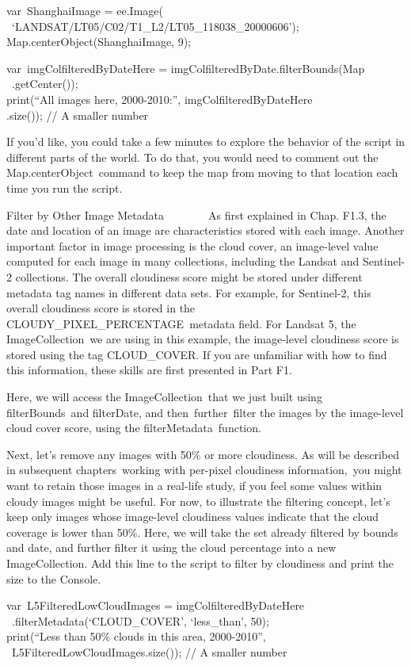 \documentclass[
  letterpaper,
  DIV=11,
  numbers=noendperiod]{scrreprt}
\begin{document}
var~ShanghaiImage = ee.Image(~
~`LANDSAT/LT05/C02/T1\_L2/LT05\_118038\_20000606');\\
Map.centerObject(ShanghaiImage, 9);

var~imgColfilteredByDateHere = imgColfilteredByDate.filterBounds(Map~
~.getCenter());\\
print(``All images here, 2000-2010:'', imgColfilteredByDateHere\\
.size()); // A smaller number

If you'd like, you could take a few minutes to explore the behavior of
the script in different parts of the world. To do that, you would need
to comment out the Map.centerObject~command to keep the map from moving
to that location each time you run the script.

Filter by Other Image Metadata~~~~~~~~As first explained in Chap. F1.3,
the date and location of an image are characteristics stored with each
image. Another important factor in image processing is the cloud cover,
an image-level value computed for each image in many collections,
including the Landsat and Sentinel-2 collections. The overall cloudiness
score might be stored under different metadata tag names in different
data sets. For example, for Sentinel-2, this overall cloudiness score is
stored in the CLOUDY\_PIXEL\_PERCENTAGE~metadata field. For Landsat 5,
the ImageCollection~we are using in this example, the image-level
cloudiness score is stored using the tag CLOUD\_COVER. If you are
unfamiliar with how to find this information, these skills are first
presented in Part F1.

Here, we will access the ImageCollection~that we just built using
filterBounds~and filterDate, and then~further~filter the images by the
image-level cloud cover score, using the filterMetadata~function.

Next, let's remove any images with 50\% or more cloudiness. As will be
described in subsequent chapters~working with per-pixel cloudiness
information,~you might want to retain those images in a real-life study,
if you feel some values within cloudy images might be useful. For now,
to illustrate the filtering concept, let's keep only images whose
image-level cloudiness values indicate that the cloud coverage is lower
than 50\%. Here, we will take the set already filtered by bounds and
date, and further filter it using the cloud percentage into a new
ImageCollection. Add this line to the script to filter by cloudiness and
print the size to the Console.

var~L5FilteredLowCloudImages = imgColfilteredByDateHere\\
\hspace*{0.333em} ~.filterMetadata(`CLOUD\_COVER', `less\_than', 50);\\
print(``Less than 50\% clouds in this area, 2000-2010'',\\
\hspace*{0.333em} ~L5FilteredLowCloudImages.size()); // A smaller number
\end{document}

